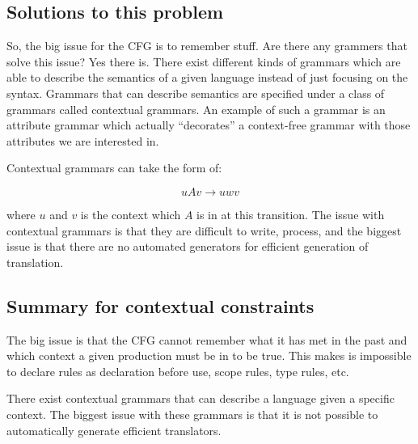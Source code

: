 \subsection{Solutions to this problem}
So, the big issue for the CFG is to remember stuff. Are there any grammers that solve this
issue? Yes there is. There exist different kinds of grammars which are able to
describe the semantics of a given language instead of just focusing on the
syntax. Grammars that can describe semantics are specified under a class of
grammars called contextual grammars.
\cite{plpp}
An example of such a grammar is an attribute grammar which actually
``decorates'' a context-free grammar with those attributes we are interested
in.
\cite{attrgrammar}

Contextual grammars can take the form of:

\[
  uAv \rightarrow uwv
\]

where $u$ and $v$ is the context which $A$ is in at this transition.
The issue with contextual grammars is that they are difficult to write,
process, and the biggest issue is that there are no automated
generators for efficient generation of translation.
\cite{attrgrammar}

\subsection{Summary for contextual constraints}
The big issue is that the CFG cannot remember what it has met in the past and
which context a given production must be in to be true. This makes is impossible 
to declare rules as declaration before use, scope rules, type rules, etc.

There exist contextual grammars that can describe a language given a specific
context. The biggest issue with these grammars is that it is not possible to
automatically generate efficient translators.

